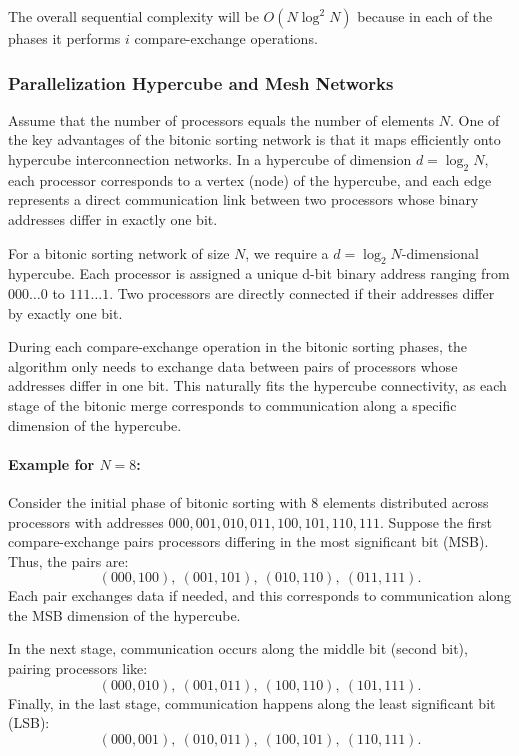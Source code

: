 \documentclass[12pt]{book}
\begin{document}
The overall sequential complexity will be $O(N\log^2N)$ because in each of the phases it performs $i$ compare-exchange operations.

\subsubsection{Parallelization Hypercube and Mesh Networks}
Assume that the number of processors equals the number of elements $N$.
One of the key advantages of the bitonic sorting network is that it maps efficiently onto 
hypercube interconnection networks. In a hypercube of dimension \( d = \log_2 N \), 
each processor corresponds to a vertex (node) of the hypercube, and each edge represents a 
direct communication link between two processors whose binary addresses differ in exactly one bit.

For a bitonic sorting network of size \( N \), we require a \( d = \log_2 N \)-dimensional hypercube. Each processor is assigned a unique d-bit binary address ranging from \( 000\ldots 0 \) to \( 111\ldots 1 \). Two processors are directly connected if their addresses differ by exactly one bit.

During each compare-exchange operation in the bitonic sorting phases, the algorithm only needs to 
exchange data between pairs of processors whose addresses differ in one bit. This naturally fits the hypercube connectivity, as each stage of the bitonic merge corresponds to communication along a specific dimension of the hypercube.

\paragraph{Example for \( N=8 \):}

Consider the initial phase of bitonic sorting with 8 elements distributed across processors 
with addresses \( 000, 001, 010, 011, 100, 101, 110, 111 \).
Suppose the first compare-exchange pairs processors differing in the most significant bit (MSB).
Thus, the pairs are:
\[
(000,100), \ (001,101), \ (010,110), \ (011,111).
\]
Each pair exchanges data if needed, and this corresponds to communication along the MSB dimension of the hypercube.

In the next stage, communication occurs along the middle bit (second bit), 
pairing processors like:
\[
(000,010), \ (001,011), \ (100,110), \ (101,111).
\]
Finally, in the last stage, communication happens along the least significant bit (LSB):
\[
(000,001), \ (010,011), \ (100,101), \ (110,111).
\]
\end{document}
